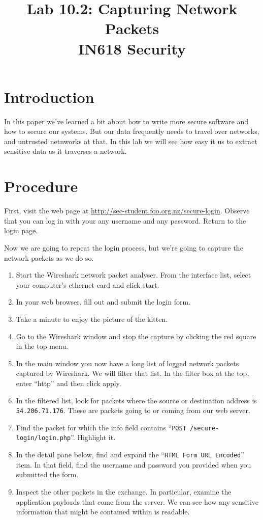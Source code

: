 \documentclass{article}
\begin{document}
\title{ Lab 10.2: Capturing Network Packets \\ IN618 Security}
\maketitle

\section*{Introduction}
In this paper we've learned a bit about how to write more secure software and how to secure our systems.  But our data frequently needs to travel over networks, and untrusted netnworks at that.  In this lab we will see how easy it us to extract sensitive data as it traverses a network.

\section{Procedure}
First, visit the web page at \url{http://sec-student.foo.org.nz/secure-login}.  Observe that you can log in with your any username and any password.  Return to the login page.

Now we are going to repeat the login process, but we're going to capture the network packets as we do so.

\begin{enumerate}
	\item Start the Wireshark network packet analyser. From the interface list, select your computer's ethernet card and click start.
	\item In your web browser, fill out and submit the login form.
	\item Take a minute to enjoy the picture of the kitten.
	\item Go to the Wireshark window and stop the capture by clicking the red square in the top menu.
	\item In the main window you now have a long list of logged network packets captured by Wireshark. We will filter that list.  In the filter box at the top, enter ``http'' and then click apply. 
	\item In the filtered list, look for packets where the source or destination address is \texttt{54.206.71.176}.  These are packets going to or coming from our web server.
	\item Find the packet for which the info field contains ``\texttt{POST /secure-login/login.php}''. Highlight it.
	\item In the detail pane below, find and expand the ``\texttt{HTML Form URL Encoded}'' item. In that field,
	find the username and password you provided when you submitted the form.
	\vspace{20mm}
	\item Inspect the other packets in the exchange.  In particular, examine the application payloads that come from the server.  We can see how any sensitive information that might be contained within is readable.
\end{enumerate}
\end{document}
